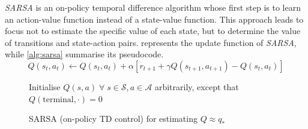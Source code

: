 \textit{SARSA} is an on-policy temporal difference algorithm whose first step is to learn an action-value function instead of a state-value function.
This approach leads to focus not to estimate the specific value of each state, but to determine the value of transitions and state-action pairs.
 represents the update function of \textit{SARSA}, while \vref{alg:sarsa} summarise its pseudocode.
\begin{equation}\label{eq:sarsa}
	Q(s_t, a_t) \leftarrow Q(s_t, a_t) + \alpha [r_{t+1} + \gamma Q(s_{t+1}, a_{t+1}) - Q(s_t, a_t)]
\end{equation}
\begin{figure}

	\begin{algorithm}[H]
		\SetAlgoLined
		\DontPrintSemicolon
		\LinesNumbered
		\KwIn{step size $\alpha \in (0,1]$, small $\epsilon > 0$\;}
		Initialise $Q(s,a) \; \forall\; s \in \mathcal{S}, a \in \mathcal{A}$ arbitrarily, except that $Q(\text{terminal}, \cdot) = 0$\;
		\caption{SARSA (on-policy TD control) for estimating $Q \approx q_*$}
		\label{alg:sarsa}
	\end{algorithm}
\end{figure}

